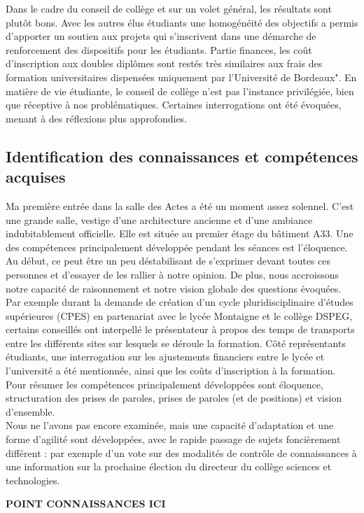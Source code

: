 \documentclass{article}
\begin{document}
Dans le cadre du conseil de collège et sur un volet général, les résultats sont plutôt bons. 
Avec les autres élus étudiants une homogénéité des objectifs a permis d'apporter un soutien aux projets qui s'inscrivent dans une démarche de renforcement des dispositifs pour les étudiants. 
Partie finances, les coût d'inscription aux doubles diplômes sont restés très similaires aux frais des formation universitaires dispensées uniquement par l'Université de Bordeaux". 
En matière de vie étudiante, le conseil de collège n'est pas l'instance privilégiée, bien que réceptive à nos problématiques. 
Certaines interrogations ont été évoquées, menant à des réflexions plus approfondies.

\subsection{Identification des connaissances et compétences acquises}
Ma première entrée dans la salle des Actes a été un moment assez solennel. 
C'est une grande salle, vestige d'une architecture ancienne et d'une ambiance indubitablement officielle. 
Elle est située au premier étage du bâtiment A33. 
Une des compétences principalement développée pendant les séances est l'éloquence. 
Au début, ce peut être un peu déstabilisant de s'exprimer devant toutes ces personnes et d'essayer de les rallier à notre opinion. 
De plus, nous accroissons notre capacité de raisonnement et notre vision globale des questions évoquées. 
Par exemple durant la demande de création d'un cycle pluridisciplinaire d'études supérieures (CPES) en partenariat avec le lycée Montaigne et le collège DSPEG, certains conseillés ont interpellé le présentateur à propos des temps de transports entre les différents sites sur lesquels se déroule la formation. 
Côté représentants étudiants, une interrogation sur les ajustements financiers entre le lycée et l'université a été mentionnée, ainsi que les coûts d'inscription à la formation.
Pour résumer les compétences principalement développées sont éloquence, structuration des prises de paroles, prises de paroles (et de positions) et vision d'ensemble. \\ 
Nous ne l'avons pas encore examinée, mais une capacité d'adaptation et une forme d'agilité sont développées, avec le rapide passage de sujets foncièrement différent : par exemple d'un vote sur des modalités de contrôle de connaissances à une information sur la prochaine élection du directeur du collège sciences et technologies. \par
\textbf{POINT CONNAISSANCES ICI}
\newpage
\end{document}
